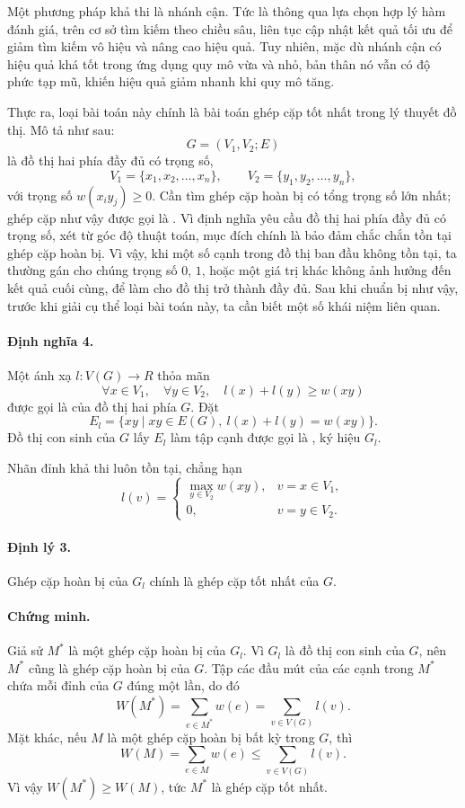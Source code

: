 \documentclass[11pt]{article}
\begin{document}
Một phương pháp khả thi là nhánh cận. Tức là thông qua lựa chọn hợp lý hàm
đánh giá, trên cơ sở tìm kiếm theo chiều sâu, liên tục cập nhật kết quả tối
ưu để giảm tìm kiếm vô hiệu và nâng cao hiệu quả. Tuy nhiên, mặc dù nhánh
cận có hiệu quả khá tốt trong ứng dụng quy mô vừa và nhỏ, bản thân nó vẫn có
độ phức tạp mũ, khiến hiệu quả giảm nhanh khi quy mô tăng.

Thực ra, loại bài toán này chính là bài toán ghép cặp tốt nhất trong lý
thuyết đồ thị. Mô tả như sau:
\[
  G=(V_1,V_2;E)
\]
là đồ thị hai phía đầy đủ có trọng số,
\[
  V_1=\{x_1,x_2,\ldots,x_n\},\qquad
  V_2=\{y_1,y_2,\ldots,y_n\},
\]
với trọng số \(w(x_iy_j)\ge 0\). Cần tìm ghép cặp hoàn bị có tổng trọng số
lớn nhất; ghép cặp như vậy được gọi là . Vì định
nghĩa yêu cầu đồ thị hai phía đầy đủ có trọng số, xét từ góc độ thuật toán,
mục đích chính là bảo đảm chắc chắn tồn tại ghép cặp hoàn bị. Vì vậy, khi
một số cạnh trong đồ thị ban đầu không tồn tại, ta thường gán cho chúng trọng
số \(0\), \(1\), hoặc một giá trị khác không ảnh hưởng đến kết quả cuối cùng,
để làm cho đồ thị trở thành đầy đủ. Sau khi chuẩn bị như vậy, trước khi giải
cụ thể loại bài toán này, ta cần biết một số khái niệm liên quan.

\paragraph{Định nghĩa 4.}
Một ánh xạ \(l:V(G)\to R\) thỏa mãn
\[
  \forall x\in V_1,\quad \forall y\in V_2,\quad
  l(x)+l(y)\ge w(xy)
\]
được gọi là  của đồ thị hai phía \(G\). Đặt
\[
  E_l=\{xy\mid xy\in E(G),\ l(x)+l(y)=w(xy)\}.
\]
Đồ thị con sinh của \(G\) lấy \(E_l\) làm tập cạnh được gọi là
, ký hiệu \(G_l\).

Nhãn đỉnh khả thi luôn tồn tại, chẳng hạn
\[
l(v)=
\begin{cases}
\max_{y\in V_2} w(xy), & v=x\in V_1,\\
0, & v=y\in V_2.
\end{cases}
\]

\paragraph{Định lý 3.}
Ghép cặp hoàn bị của \(G_l\) chính là ghép cặp tốt nhất của \(G\).

\paragraph{Chứng minh.}
Giả sử \(M^*\) là một ghép cặp hoàn bị của \(G_l\). Vì \(G_l\) là đồ thị con
sinh của \(G\), nên \(M^*\) cũng là ghép cặp hoàn bị của \(G\). Tập các đầu
mút của các cạnh trong \(M^*\) chứa mỗi đỉnh của \(G\) đúng một lần, do đó
\[
  W(M^*)=\sum_{e\in M^*}w(e)=\sum_{v\in V(G)}l(v).
\]
Mặt khác, nếu \(M\) là một ghép cặp hoàn bị bất kỳ trong \(G\), thì
\[
  W(M)=\sum_{e\in M}w(e)\le \sum_{v\in V(G)}l(v).
\]
Vì vậy \(W(M^*)\ge W(M)\), tức \(M^*\) là ghép cặp tốt nhất.
\end{document}
